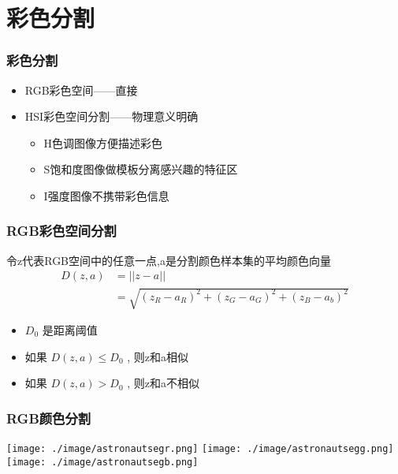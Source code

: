 \documentclass{beamer}
\begin{document}
\section{彩色分割}
\label{sec-7}
\begin{frame}
\frametitle{彩色分割}
\label{sec-7-1}

\begin{itemize}
\item RGB彩色空间——直接
\item HSI彩色空间分割——物理意义明确
\begin{itemize}
\item H色调图像方便描述彩色
\item S饱和度图像做模板分离感兴趣的特征区
\item I强度图像不携带彩色信息
\end{itemize}
\end{itemize}
\end{frame}
\begin{frame}
\frametitle{RGB彩色空间分割}
\label{sec-7-2}

令z代表RGB空间中的任意一点,a是分割颜色样本集的平均颜色向量
\begin{align*}
 D(z,a) &= ||z-a|| \\
&= \sqrt{(z_R-a_R)^2+(z_G-a_G)^2+(z_B-a_b)^2}
\end{align*}

\begin{itemize}
\item $D_0$ 是距离阈值
\item 如果 $D(z,a) \leq D_0$ , 则z和a相似
\item 如果 $D(z,a) > D_0$ , 则z和a不相似
\end{itemize}
\end{frame}
\begin{frame}
\frametitle{RGB颜色分割}
\label{sec-7-3}

\texttt{[image: ./image/astronautsegr.png]}
\texttt{[image: ./image/astronautsegg.png]}
\texttt{[image: ./image/astronautsegb.png]}
\end{frame}
\end{document}
